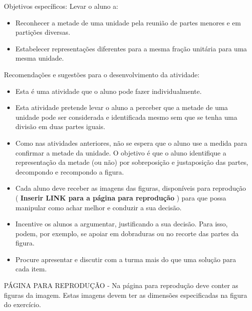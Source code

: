 \documentclass[a4paper,12pt,twoside]{book}
\begin{document}
\begin{professor*}[breakable]{}{}  
  Objetivos específicos: Levar o aluno a:  
\begin{itemize} %
    \item       Reconhecer a metade de uma unidade pela reunião de partes menores e em partições diversas. 
    \item       Estabelecer representações diferentes para a mesma fração unitária para uma mesma unidade.
\end{itemize} %
  
  
  Recomendações e sugestões para o desenvolvimento da atividade:  
\begin{itemize} %
    \item       Esta é uma atividade que o aluno pode fazer individualmente.
    \item       Esta atividade pretende levar o aluno a perceber que a metade de uma unidade pode ser considerada e identificada mesmo sem que se tenha uma divisão em duas partes iguais. 
    \item       Como nas atividades anteriores, não se espera que o aluno use a medida para confirmar a metade da unidade. O objetivo é que o aluno identifique a representação da metade (ou não) por sobreposição e justaposição das partes, decompondo e recompondo a figura.
    \item       Cada aluno deve receber as imagens das figuras, disponíveis para reprodução (      {\bf Inserir LINK para a página para reprodução}      ) para que possa manipular como achar melhor e conduzir a sua decisão. 
    \item       Incentive os alunos a argumentar, justificando a sua decisão. Para isso, podem, por exemplo, se apoiar em dobraduras ou no recorte das partes da figura.
    \item       Procure apresentar e discutir com a turma mais do que uma solução para cada item.   
\end{itemize} %
  
  
  \begin{imagem*}[breakable]{}{}         
    \begin{nota*}[breakable]{}{}       PÁGINA PARA REPRODUÇÃO - Na página para reprodução deve conter as figuras da imagem. Estas imagens devem ter as dimensões especificadas na figura do exercício.      
    \end{nota*}    
  \end{imagem*}  
\end{professor*}
\end{document}
